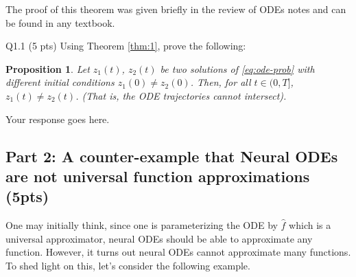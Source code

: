 \documentclass[12pt,letterpaper, onecolumn]{exam}
\newtheorem{proposition}[theorem]{Proposition}
\theoremstyle{definition}
\begin{document}
The proof of this theorem was given briefly in the review of ODEs notes and can be found in any textbook. 

\color{orange} Q1.1 (5 pts) \color{black} Using Theorem \ref{thm:1}, prove the following:
\begin{proposition} \label{prop:2}
    Let $z_1(t)$, $z_2(t)$ be two solutions of \eqref{eq:ode-prob} with different initial conditions $z_1(0) \neq z_2(0)$. Then, for all $t \in (0, T]$, $z_1(t) \neq z_2(t)$. (That is, the ODE trajectories cannot intersect). 
\end{proposition}

\begin{tcolorbox}\centering
    Your response goes here. 
\end{tcolorbox}

\color{black}

\subsection{Part 2: A counter-example that Neural ODEs are not universal function approximations (5pts)}


\textbf{}

One may initially think, since one is parameterizing the ODE by $\hat{f}$ which is a universal approximator, neural ODEs should be able to approximate any function. However, it turns out neural ODEs cannot approximate many functions. To shed light on this, let's consider the following example.
\end{document}
